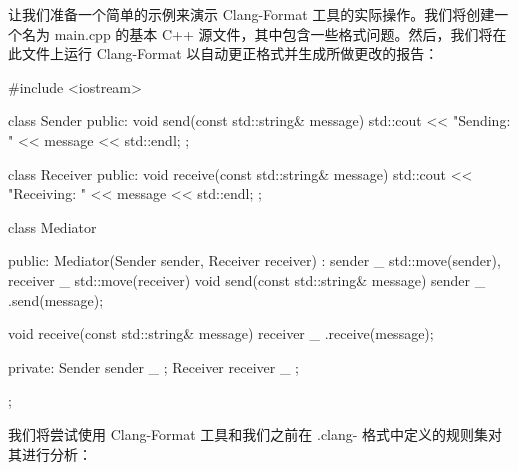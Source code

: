 让我们准备一个简单的示例来演示 Clang-Format 工具的实际操作。我们将创建一个名为 main.cpp 的基本 C++ 源文件，其中包含一些格式问题。然后，我们将在此文件上运行 Clang-Format 以自动更正格式并生成所做更改的报告：

\begin{cpp}
#include <iostream>

class Sender {
public:
    void send(const std::string& message) {
        std::cout << "Sending: " << message << std::endl;
    }
};

class Receiver {
public:
    void receive(const std::string& message) {
        std::cout << "Receiving: " << message << std::endl;
    }
};

class Mediator {
public:
    Mediator(Sender sender, Receiver receiver)
        : sender _ {std::move(sender)}, receiver _ {std::move(receiver)} {}
    void send(const std::string& message) {
        sender _ .send(message);
    }

    void receive(const std::string& message) {
        receiver _ .receive(message);
    }

private:
    Sender sender _ ;
    Receiver receiver _ ;
};
\end{cpp}

我们将尝试使用 Clang-Format 工具和我们之前在 .clang- 格式中定义的规则集对其进行分析：

